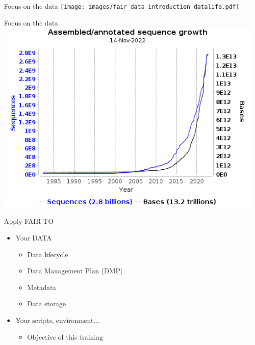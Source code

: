 \begin{frame}{Focus on the data}
\centering\texttt{[image: images/fair\_data\_introduction\_datalife.pdf]}
\end{frame}

\begin{frame}{Focus on the data}
\centering\includegraphics[scale=0.50]{images/ena_embl_growth.png}
\end{frame}

\begin{frame}
\begin{block}{Apply FAIR TO}
\begin{itemize}
\item Your DATA
	\begin{itemize}
	\item Data lifecycle
	\item Data Management Plan (DMP)
	\item Metadata
	\item Data storage
	\end{itemize}
\item Your scripts, environment...
	\begin{itemize}
	\item Objective of this training
	\end{itemize}
\end{itemize}
\end{block}
\end{frame}


